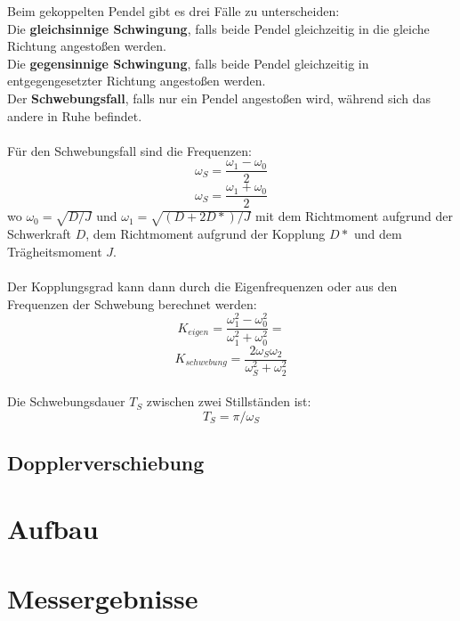 \documentclass{article}
\begin{document}
Beim gekoppelten Pendel gibt es drei Fälle zu unterscheiden:\\
Die \textbf{gleichsinnige Schwingung}, falls beide Pendel gleichzeitig in die gleiche Richtung angestoßen werden.\\
Die \textbf{gegensinnige Schwingung}, falls beide Pendel gleichzeitig in entgegengesetzter Richtung angestoßen werden.\\
Der \textbf{Schwebungsfall}, falls nur ein Pendel angestoßen wird, während sich das andere in Ruhe befindet.\\
\\
Für den Schwebungsfall sind die Frequenzen:
$$\omega_S=\frac{\omega_1 - \omega_0}{2}$$
$$\omega_S=\frac{\omega_1 + \omega_0}{2}$$
wo $\omega_0=\sqrt{D/J}$ und $\omega_1=\sqrt{(D+2D*)/J}$ mit dem Richtmoment aufgrund der Schwerkraft $D$, dem Richtmoment aufgrund der Kopplung $D*$ und dem Trägheitsmoment $J$.\\
\\
Der Kopplungsgrad kann dann durch die Eigenfrequenzen oder aus den Frequenzen der Schwebung berechnet werden:
$$K_{eigen}=\frac{\omega_1^2-\omega_0^2}{\omega_1^2+\omega_0^2}=$$
$$K_{schwebung}=\frac{2\omega_S \omega_2}{\omega_S^2 + \omega_2^2}$$
\\
Die Schwebungsdauer $T_S$ zwischen zwei Stillständen ist:
$$T_S=\pi/\omega_S$$

\subsection{Dopplerverschiebung}


\section{Aufbau}
\section{Messergebnisse}
\end{document}
